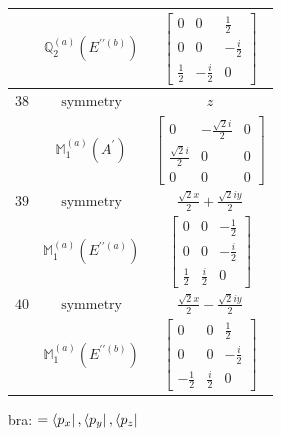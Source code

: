 \documentclass[fleqn,8pt,landscape]{jsarticle}
\begin{document}
\begin{longtable}{ccc}
$  $ & $ \mathbb{Q}_{2}^{(a)}(E^{\prime\prime(b)}) $ & $ \begin{bmatrix} 0 & 0 & \frac{1}{2} \\ 0 & 0 & - \frac{i}{2} \\ \frac{1}{2} & - \frac{i}{2} & 0 \end{bmatrix} $ \\ \hline
$ 38 $ & $ \text{symmetry} $ & $ z $ \\
$  $ & $ \mathbb{M}_{1}^{(a)}(A^{\prime}) $ & $ \begin{bmatrix} 0 & - \frac{\sqrt{2} i}{2} & 0 \\ \frac{\sqrt{2} i}{2} & 0 & 0 \\ 0 & 0 & 0 \end{bmatrix} $ \\ \hline
$ 39 $ & $ \text{symmetry} $ & $ \frac{\sqrt{2} x}{2} + \frac{\sqrt{2} i y}{2} $ \\
$  $ & $ \mathbb{M}_{1}^{(a)}(E^{\prime\prime(a)}) $ & $ \begin{bmatrix} 0 & 0 & - \frac{1}{2} \\ 0 & 0 & - \frac{i}{2} \\ \frac{1}{2} & \frac{i}{2} & 0 \end{bmatrix} $ \\ \hline
$ 40 $ & $ \text{symmetry} $ & $ \frac{\sqrt{2} x}{2} - \frac{\sqrt{2} i y}{2} $ \\
$  $ & $ \mathbb{M}_{1}^{(a)}(E^{\prime\prime(b)}) $ & $ \begin{bmatrix} 0 & 0 & \frac{1}{2} \\ 0 & 0 & - \frac{i}{2} \\ - \frac{1}{2} & \frac{i}{2} & 0 \end{bmatrix} $ \\ \hline
\end{longtable}
bra: $=\bra{p_{x}}, \bra{p_{y}}, \bra{p_{z}}$
\end{document}
